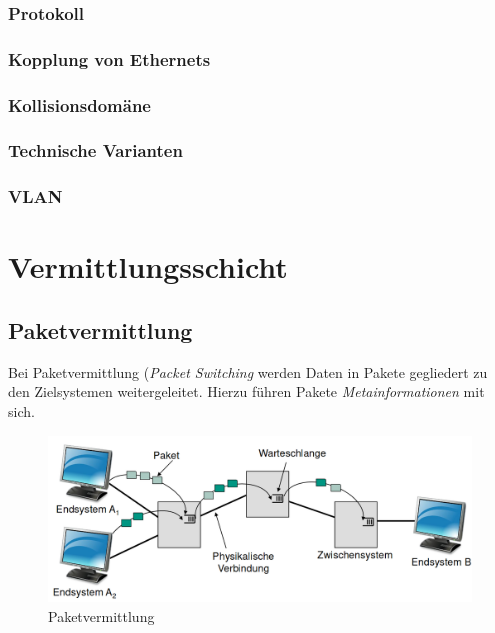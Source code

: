 \documentclass[a4paper, 14pt]{article}
\begin{document}
	\subsubsection{Protokoll}

	\subsubsection{Kopplung von Ethernets}

	\subsubsection{Kollisionsdomäne}

	\subsubsection{Technische Varianten}

	\subsubsection{VLAN}

	\section{Vermittlungsschicht}

	\subsection{Paketvermittlung}

	Bei Paketvermittlung (\emph{Packet Switching} werden Daten in Pakete gegliedert zu den Zielsystemen weitergeleitet.
	Hierzu führen Pakete \emph{Metainformationen} mit sich.

	\begin{figure}
		\includegraphics[width=\textwidth]{images/05-packet-switching.png}
		\caption{Paketvermittlung}
	\end{figure}
\end{document}
